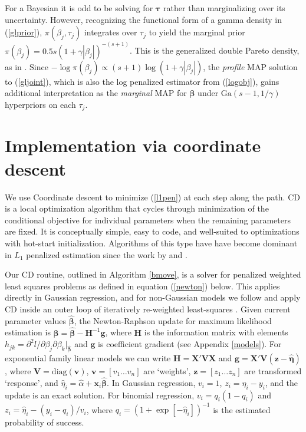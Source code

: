 \documentclass[12pt]{article}
\newcommand{\bs}[1]{\boldsymbol{#1}}
\newcommand{\mr}[1]{\mathrm{#1}}
\newcommand{\bm}[1]{\mathbf{#1}}
\begin{document}
For a Bayesian it is odd to be solving for $\bs{\tau}$ rather than
marginalizing over its uncertainty.  However, recognizing the functional form
of a gamma density  in (\ref{glprior}), $\pi(\beta_j,\tau_j)$ integrates over
$\tau_j$ to yield the marginal prior $ \pi(\beta_j) = 0.5s\left( 1+
\gamma|\beta_j|\right)^{-(s+1)}$. This is the generalized double Pareto
density, as in  \citet{armagan_generalized_2013}. Since $-\log \pi(\beta_j)
\propto (s+1)\log(1 + \gamma|\beta_j|)$, the {\it profile} MAP solution to
(\ref{gljoint}), which is also the log penalized estimator from
(\ref{logobj}), gains additional interpretation as the {\it marginal} MAP for
$\bs{\beta}$ under $\mr{Ga}(s-1,1/\gamma)$ hyperpriors on each $\tau_j$.

\section{Implementation via coordinate descent}
\label{implement}

We use Coordinate descent \citep[CD; e.g.,][]{luenberger_linear_2008} to minimize
(\ref{l1pen}) at each step along the path. CD is a local optimization
algorithm that cycles through minimization of the conditional objective for
individual parameters when the remaining parameters are fixed.  It is
conceptually simple, easy to code, and well-suited to optimizations with
hot-start initialization. Algorithms of this type have have become dominant in
$L_1$ penalized estimation since the work by \citet{friedman_pathwise_2007} and
\citet{wu_coordinate_2008}.

Our CD routine, outlined in Algorithm \ref{bmove}, is a solver for penalized
weighted least squares problems as defined in equation (\ref{newton}) below.
This applies directly in Gaussian regression, and for non-Gaussian models  we
follow \citet{friedman_regularization_2010} and apply CD inside an outer loop
of iteratively re-weighted least-squares \citep[IRLS;
e.g.,][]{green_iteratively_1984}. Given current parameter values
$\bs{\hat\beta}$, the Newton-Raphson update for maximum likelihood estimation
is $\bs{\beta} = \bs{\hat\beta} - \bm{H}^{-1}\bm{g}$, where $\bm{H}$ is the
information matrix with elements $h_{jk} = \partial^2 l/\partial
\beta_j\partial \beta_k |_{\bs{\hat\beta}}$ and $\bm{g}$ is coefficient
gradient (see Appendix \ref{models}). For exponential family linear models we
can write $\bm{H} = \bm{X}'\bm{V}\bm{X}$ and $\bm{g} = \bm{X}'\bm{V}(\bm{z} -
\bs{\hat\eta})$, where $\bm{V} = \mr{diag}(\bm{v})$, $\bm{v} = [v_1\ldots
v_n]$ are `weights', $\bm{z} = [z_1\ldots z_n]$ are transformed `response',
and $\hat\eta_i = \hat\alpha + \bm{x}_i\bs{\hat\beta}$.  In Gaussian
regression,  $v_i = 1$, $z_i=\hat\eta_i - y_i$, and the update is an exact
solution. For binomial regression, $v_i = q_i(1-q_i)$ and $z_i = \hat\eta_i -
(y_i-q_i)/v_i$, where $q_i = (1 + \exp[-\hat\eta_i])^{-1}$ is the  estimated
probability of success.
\end{document}

